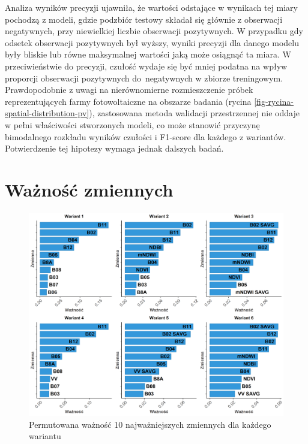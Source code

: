 \documentclass{amuthesis}
\begin{document}
Analiza wyników precyzji ujawniła, że wartości odstające w wynikach tej
miary pochodzą z modeli, gdzie podzbiór testowy składał się głównie z
obserwacji negatywnych, przy niewielkiej liczbie obserwacji pozytywnych.
W przypadku gdy odsetek obserwacji pozytywnych był wyższy, wyniki
precyzji dla danego modelu były bliskie lub równe maksymalnej wartości
jaką może osiągnąć ta miara. W przeciwieństwie do precyzji, czułość
wydaje się być mniej podatna na wpływ proporcji obserwacji pozytywnych
do~negatywnych w zbiorze treningowym. Prawdopodobnie z uwagi na
nierównomierne rozmieszczenie próbek reprezentujących farmy
fotowoltaiczne na obszarze badania (rycina
\ref{fig-rycina-spatial-distribution-pv}), zastosowana metoda walidacji
przestrzennej nie oddaje w pełni właściwości stworzonych modeli, co może
stanowić przyczynę bimodalnego rozkładu wyników czułości i F1-score dla
każdego z wariantów. Potwierdzenie tej hipotezy wymaga jednak dalszych
badań.

\hypertarget{sec-results-variable-importance}{%
\section{Ważność zmiennych}\label{sec-results-variable-importance}}

\begin{figure}[t]

{\centering \includegraphics[width=1.05\textwidth,height=\textheight]{figures/importance_cowplot_pl.png}

}

\caption{\label{fig-rycina-variance-importance_cowplot}Permutowana
ważność 10 najważniejszych zmiennych dla każdego wariantu}

\end{figure}
\end{document}
